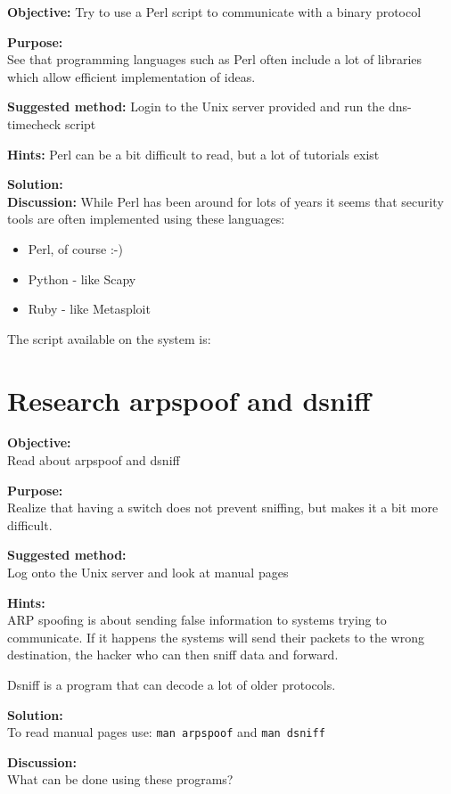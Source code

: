 \documentclass[a4paper,11pt,notitlepage]{report}
\begin{document}
{\bf Objective:}
Try to use a Perl script to communicate with a binary protocol

{\bf Purpose:}\\
See that programming languages such as Perl often include a lot of libraries which allow efficient implementation of ideas.

{\bf Suggested method:}
Login to the Unix server provided and run the dns-timecheck script

{\bf Hints:}
Perl can be a bit difficult to read, but a lot of tutorials exist

{\bf Solution:}\\

{\bf Discussion:}
While Perl has been around for lots of years it seems that security tools are often implemented using these languages:
\begin{itemize}
\item Perl, of course :-)
\item Python - like Scapy
\item Ruby - like Metasploit
\end{itemize}

The script available on the system is:
{\small
{}
}


\chapter{Research arpspoof and dsniff}
\label{ex:arpspoof}
{\bf Objective:} \\
Read about arpspoof and dsniff

{\bf Purpose:}\\
Realize that having a switch does not prevent sniffing, but makes it a bit more difficult.

{\bf Suggested method:} \\
Log onto the Unix server and look at manual pages

{\bf Hints:} \\
ARP spoofing is about sending false information to systems trying to communicate. If it happens the systems will send their packets to the wrong destination, the hacker who can then sniff data and forward.

Dsniff is a program that can decode a lot of older protocols.

{\bf Solution:}\\
To read manual pages use: \verb+man arpspoof+ and
\verb+man dsniff+


{\bf Discussion:}\\
What can be done using these programs?
\end{document}
